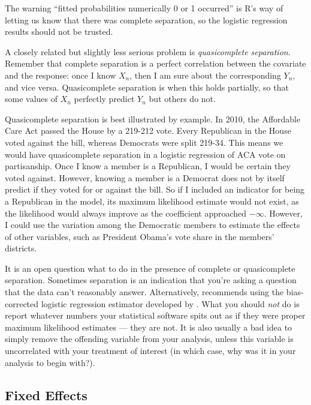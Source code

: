 \documentclass[
  12pt,
  oneside,openany]{book}
\begin{document}
The warning ``fitted probabilities numerically 0 or 1 occurred'' is R's way of letting us know that there was complete separation, so the logistic regression results should not be trusted.

A closely related but slightly less serious problem is \emph{quasicomplete separation}.
Remember that complete separation is a perfect correlation between the covariate and the response: once I know \(X_n\), then I am sure about the corresponding \(Y_n\), and vice versa.
Quasicomplete separation is when this holds partially, so that some values of \(X_n\) perfectly predict \(Y_n\) but others do not.

Quasicomplete separation is best illustrated by example.
In 2010, the Affordable Care Act passed the House by a 219-212 vote.
Every Republican in the House voted against the bill, whereas Democrats were split 219-34.
This means we would have quasicomplete separation in a logistic regression of ACA vote on partisanship.
Once I know a member is a Republican, I would be certain they voted against.
However, knowing a member is a Democrat does not by itself predict if they voted for or against the bill.
So if I included an indicator for being a Republican in the model, its maximum likelihood estimate would not exist, as the likelihood would always improve as the coefficient approached \(- \infty\).
However, I could use the variation among the Democratic members to estimate the effects of other variables, such as President Obama's vote share in the members' districts.

It is an open question what to do in the presence of complete or quasicomplete separation.
Sometimes separation is an indication that you're asking a question that the data can't reasonably answer.
Alternatively, \citet{zorn2005solution} recommends using the bias-corrected logistic regression estimator developed by \citet{firth1993bias}.
What you should \emph{not} do is report whatever numbers your statistical software spits out as if they were proper maximum likelihood estimates --- they are not.
It is also usually a bad idea to simply remove the offending variable from your analysis, unless this variable is uncorrelated with your treatment of interest (in which case, why was it in your analysis to begin with?).

\hypertarget{fixed-effects-1}{%
\subsection{Fixed Effects}\label{fixed-effects-1}}
\end{document}
